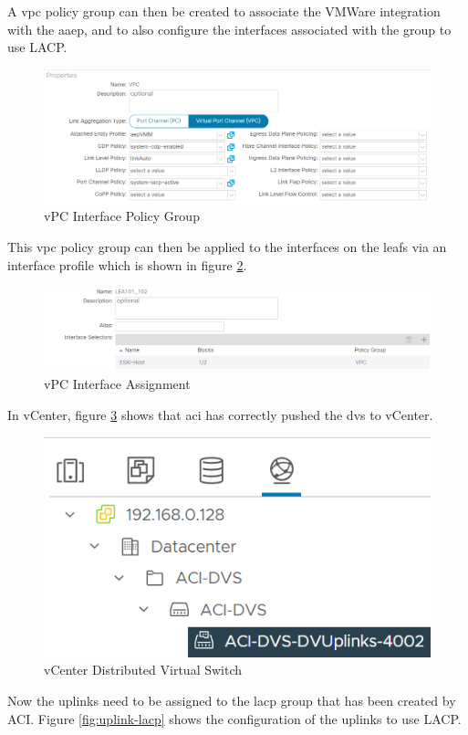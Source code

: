 A \gls{vpc} policy group can then be created to associate the VMWare
integration with the \gls{aaep}, and to also configure the interfaces
associated with the group to use LACP.

\begin{figure}[H]

    \centering
    \includegraphics[scale=0.7]{images/vpc-interface-policy.png}

    \caption{vPC Interface Policy Group}
    \label{fig:vpc-int-pol}
\end{figure}

This \gls{vpc} policy group can then be applied to the interfaces on the leafs
via an interface profile which is shown in figure
\ref{fig:vpc-interface-assignment}.
\begin{figure}[H]

    \centering
    \includegraphics[scale=0.7]{images/vpc-interface-assignment.png}

    \caption{vPC Interface Assignment}
    \label{fig:vpc-interface-assignment}
\end{figure}

In vCenter, figure \ref{fig:vcenter-dvs} shows that \gls{aci} has correctly
pushed the \gls{dvs} to vCenter.

\begin{figure}[H]

    \centering
    \includegraphics[scale=0.7]{images/vcenter-dvs.png}

    \caption{vCenter Distributed Virtual Switch}
    \label{fig:vcenter-dvs}
\end{figure}
Now the uplinks need to be assigned to the \gls{lacp} group that has been
created by ACI. Figure \ref{fig:uplink-lacp} shows the configuration of the
uplinks to use LACP.


